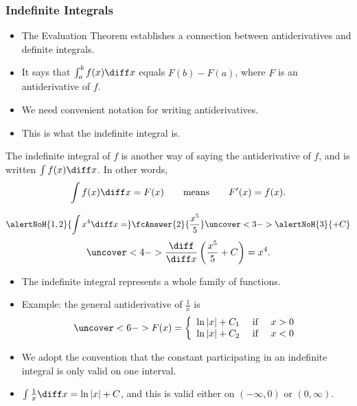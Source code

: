 \begin{frame}\frametitle{Indefinite Integrals}
\begin{itemize}
\item  The Evaluation Theorem establishes a connection between antiderivatives and definite integrals.
\item  It says that $\int_a^b f(x)\diff x$ equals $F(b) - F(a)$, where $F$ is an antiderivative of $f$.
\item  We need convenient notation for writing antiderivatives.
\item  This is what the indefinite integral is.
\end{itemize}
\begin{definition}
The indefinite integral of $f$ is another way of saying the antiderivative of $f$, and is written $\int f(x) \diff x$.  In other words,
\abovedisplayskip=0pt
\belowdisplayskip=0pt
\[
\int f(x) \diff x = F(x) \qquad \text{means}\qquad F'(x) = f(x).
\]
\end{definition}
\end{frame}

\begin{frame}
\begin{example}
\abovedisplayskip=0pt
\belowdisplayskip=0pt
\[
\alertNoH{1,2}{\int x^4 \diff x =} \fcAnswer{2}{\frac{x^5}{5}} \uncover<3->{\alertNoH{ 3}{+ C}}
\]
\abovedisplayskip=0pt
\belowdisplayskip=0pt
\[
\uncover<4->{\frac{\diff}{\diff x}\left( \frac{x^5}{5} + C\right) = x^4.}
\]
\end{example}
\begin{itemize}
\item<5->  The indefinite integral represents a whole family of functions.
\item<6->  Example: %
the general antiderivative of $\frac{1}{x}$ is
\abovedisplayskip=0pt
\belowdisplayskip=0pt
\[
\uncover<6->{%
F(x) = \left\{ \begin{array}{ccc}
\ln |x| + C_1 & \text{ if } & x > 0\\
\ln |x| + C_2 & \text{ if } & x < 0
\end{array}\right.
}%
\]
\item<7->  We adopt the convention that the constant participating in an indefinite integral is only valid on one interval.
\item<8->  $\int \frac{1}{x} \diff x = \ln |x| + C$, and this is valid either on $(-\infty , 0)$ or $(0, \infty)$.
\end{itemize}
\end{frame}
